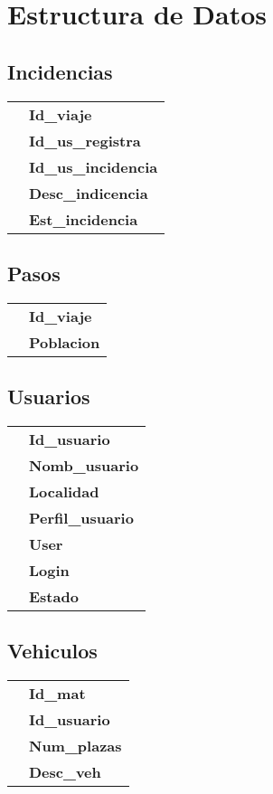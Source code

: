 \section{Estructura de Datos}
\begin{multicols}{2}
\subsection{Incidencias}
\begin{Table}
	\raggedright
	\label{struct:incidencias}
	\begin{tabular}{rl}
			\intc & \textbf{Id\_viaje}\\
			\intc & \textbf{Id\_us\_registra}\\
			\intc & \textbf{Id\_us\_incidencia}\\
			\charcp & \textbf{Desc\_indicencia}\\
			\intc & \textbf{Est\_incidencia}
		\end{tabular}
	\end{Table}
\subsection{Pasos}
\begin{Table}
	\raggedright
	\label{struct:pasos}
	\begin{tabular}{rl}
		\intc   & \textbf{Id\_viaje}\\
		\charcp & \textbf{Poblacion}
	\end{tabular}
\end{Table}
\subsection{Usuarios}
\begin{Table}
	\raggedright
	\label{struct:usuarios}
	\begin{tabular}{rl}
		\intc & \textbf{Id\_usuario}\\
		\charcp & \textbf{Nomb\_usuario}\\
		\charcp & \textbf{Localidad}\\
		\intc & \textbf{Perfil\_usuario}\\
		\charcp & \textbf{User}\\
		\charcp & \textbf{Login}\\
		\intc & \textbf{Estado}
	\end{tabular}
\end{Table}
\subsection{Vehiculos}
\begin{Table}
	\raggedright
	\label{struct:vehiculos}
	\begin{tabular}{rl}
		\charcp & \textbf{Id\_mat}\\
		\intc & \textbf{Id\_usuario}\\
		\intc & \textbf{Num\_plazas}\\
		\charcp & \textbf{Desc\_veh}
	\end{tabular}
\end{Table}

\end{multicols}
